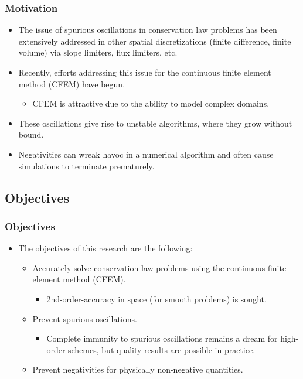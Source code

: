\documentclass{beamer} \useoutertheme{infolines}
\begin{document}
\begin{frame}
\frametitle{Motivation}

\begin{itemize}
  \item The issue of spurious oscillations in conservation law problems has
    been extensively addressed in other spatial discretizations (finite difference,
    finite volume) via slope limiters, flux limiters, etc.
  \item Recently, efforts addressing this issue for the continuous finite
    element method (CFEM) have begun.
  \begin{itemize}
    \item CFEM is attractive due to the ability to model complex domains.
  \end{itemize}
  \item These oscillations give rise to unstable algorithms, where they grow
    without bound.
  \item Negativities can wreak havoc in a numerical algorithm and often
    cause simulations to terminate prematurely.
\end{itemize}

\end{frame}
\subsection{Objectives}
\begin{frame}
\frametitle{Objectives}

\begin{itemize}
   \item The objectives of this research are the following:
   \begin{itemize}
      \item \textcolor{secondarycolorheavy}{Accurately solve conservation law
        problems} using the continuous finite element method (CFEM).
      \begin{itemize}
        \item 2nd-order-accuracy in space (for smooth problems) is sought.
      \end{itemize}
      \item \textcolor{secondarycolorheavy}{Prevent spurious oscillations}.
      \begin{itemize}
	\item Complete immunity to spurious oscillations remains a dream for
          high-order schemes, but quality results are possible in practice.
      \end{itemize}
      \item \textcolor{secondarycolorheavy}{Prevent negativities}
        for physically non-negative quantities.
   \end{itemize}
\end{itemize}

\end{frame}
\end{document}
